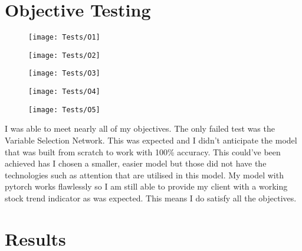 \documentclass{article}
\begin{document}
\clearpage

\section{Objective Testing}

\begin{figure}[H]
    \centering
    \texttt{[image: Tests/O1]}
\end{figure}
\begin{figure}[H]
    \centering
    \texttt{[image: Tests/O2]}
\end{figure}
\begin{figure}[H]
    \centering
    \texttt{[image: Tests/O3]}
\end{figure}
\begin{figure}[H]
    \centering
    \texttt{[image: Tests/O4]}
\end{figure}
\begin{figure}[H]
    \centering
    \texttt{[image: Tests/O5]}
\end{figure}
I was able to meet nearly all of my objectives. The only failed test was the
Variable Selection Network. This was expected and I didn't anticipate the model
that was built from scratch to work with 100\% accuracy. This could've been achieved
has I chosen a smaller, easier model but those did not have the technologies
such as attention that are utilised in this model. My model with pytorch
works flawlessly so I am still able to provide my client with a working stock
trend indicator as was expected. This means I do satisfy all the objectives.
\clearpage

\section{Results}
\end{document}
